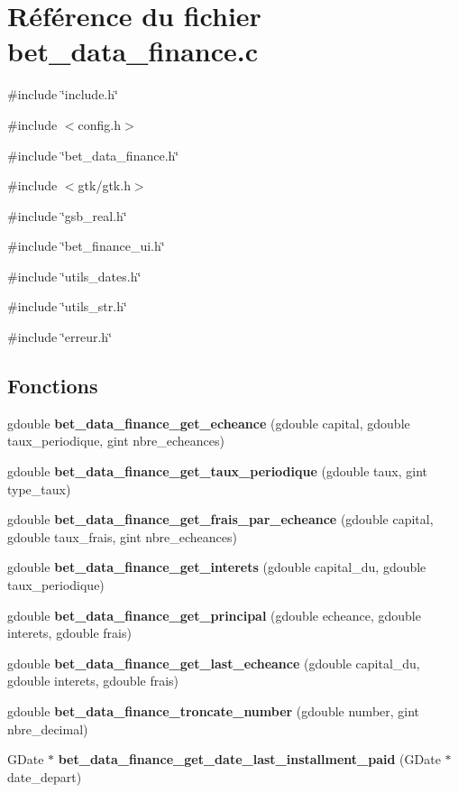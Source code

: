 \section{Référence du fichier bet\_\-data\_\-finance.c}
\label{bet__data__finance_8c}
{\ttfamily \#include \char`\"{}include.h\char`\"{}}\par
{\ttfamily \#include $<$config.h$>$}\par
{\ttfamily \#include \char`\"{}bet\_\-data\_\-finance.h\char`\"{}}\par
{\ttfamily \#include $<$gtk/gtk.h$>$}\par
{\ttfamily \#include \char`\"{}gsb\_\-real.h\char`\"{}}\par
{\ttfamily \#include \char`\"{}bet\_\-finance\_\-ui.h\char`\"{}}\par
{\ttfamily \#include \char`\"{}utils\_\-dates.h\char`\"{}}\par
{\ttfamily \#include \char`\"{}utils\_\-str.h\char`\"{}}\par
{\ttfamily \#include \char`\"{}erreur.h\char`\"{}}\par
\subsection*{Fonctions}
\begin{DoxyCompactItemize}
\item 
gdouble {\bf bet\_\-data\_\-finance\_\-get\_\-echeance} (gdouble capital, gdouble taux\_\-periodique, gint nbre\_\-echeances)
\item 
gdouble {\bf bet\_\-data\_\-finance\_\-get\_\-taux\_\-periodique} (gdouble taux, gint type\_\-taux)
\item 
gdouble {\bf bet\_\-data\_\-finance\_\-get\_\-frais\_\-par\_\-echeance} (gdouble capital, gdouble taux\_\-frais, gint nbre\_\-echeances)
\item 
gdouble {\bf bet\_\-data\_\-finance\_\-get\_\-interets} (gdouble capital\_\-du, gdouble taux\_\-periodique)
\item 
gdouble {\bf bet\_\-data\_\-finance\_\-get\_\-principal} (gdouble echeance, gdouble interets, gdouble frais)
\item 
gdouble {\bf bet\_\-data\_\-finance\_\-get\_\-last\_\-echeance} (gdouble capital\_\-du, gdouble interets, gdouble frais)
\item 
gdouble {\bf bet\_\-data\_\-finance\_\-troncate\_\-number} (gdouble number, gint nbre\_\-decimal)
\item 
GDate $\ast$ {\bf bet\_\-data\_\-finance\_\-get\_\-date\_\-last\_\-installment\_\-paid} (GDate $\ast$date\_\-depart)
\end{DoxyCompactItemize}


